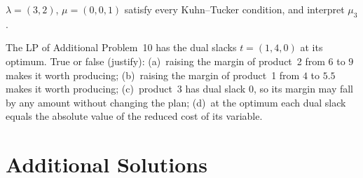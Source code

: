 \begin{problems}
        $\lambda=(3,2)$, $\mu=(0,0,1)$ satisfy every Kuhn--Tucker condition,
        and interpret $\mu_{3}$.
  \item The LP of Additional Problem~10 has the dual slacks
        $t=(1,4,0)$ at its optimum. True or false (justify):
        (a)~raising the margin of product~2 from $6$ to $9$ makes it worth
        producing;
        (b)~raising the margin of product~1 from $4$ to $5.5$ makes it
        worth producing;
        (c)~product~3 has dual slack $0$, so its margin may fall by any
        amount without changing the plan;
        (d)~at the optimum each dual slack equals the absolute value of
        the reduced cost of its variable.
\end{problems}

\section{Additional Solutions}

